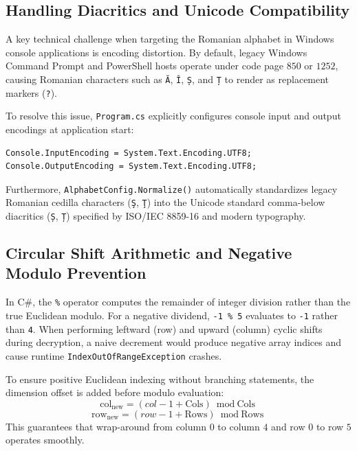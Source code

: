 \documentclass[12pt,a4paper]{article}
\begin{document}
\subsection{Handling Diacritics and Unicode Compatibility}
A key technical challenge when targeting the Romanian alphabet in Windows console applications is encoding distortion. By default, legacy Windows Command Prompt and PowerShell hosts operate under code page $850$ or $1252$, causing Romanian characters such as \texttt{Ă}, \texttt{Î}, \texttt{Ș}, and \texttt{Ț} to render as replacement markers (\texttt{?}).

To resolve this issue, \texttt{Program.cs} explicitly configures console input and output encodings at application start:
\begin{lstlisting}[numbers=none]
Console.InputEncoding = System.Text.Encoding.UTF8;
Console.OutputEncoding = System.Text.Encoding.UTF8;
\end{lstlisting}

Furthermore, \texttt{AlphabetConfig.Normalize()} automatically standardizes legacy Romanian cedilla characters (\texttt{Ş}, \texttt{Ţ}) into the Unicode standard comma-below diacritics (\texttt{Ș}, \texttt{Ț}) specified by ISO/IEC 8859-16 and modern typography.

\subsection{Circular Shift Arithmetic and Negative Modulo Prevention}
In C\#, the \texttt{\%} operator computes the remainder of integer division rather than the true Euclidean modulo. For a negative dividend, \texttt{-1 \% 5} evaluates to \texttt{-1} rather than \texttt{4}. When performing leftward (row) and upward (column) cyclic shifts during decryption, a naive decrement would produce negative array indices and cause runtime \texttt{IndexOutOfRangeException} crashes.

To ensure positive Euclidean indexing without branching statements, the dimension offset is added before modulo evaluation:
\begin{equation}
    \text{col}_{\text{new}} = (col - 1 + \text{Cols}) \bmod \text{Cols}
\end{equation}
\begin{equation}
    \text{row}_{\text{new}} = (row - 1 + \text{Rows}) \bmod \text{Rows}
\end{equation}
This guarantees that wrap-around from column $0$ to column $4$ and row $0$ to row $5$ operates smoothly.
\end{document}
